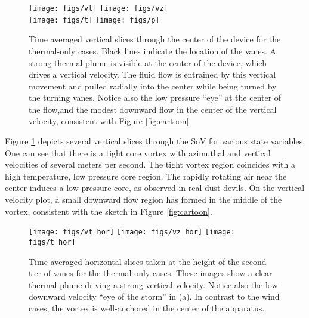 \begin{figure}[htb]

 \centering
 \texttt{[image: figs/vt]}
 \hfill
  \texttt{[image: figs/vz]}
 \\
  \centering
  \texttt{[image: figs/t]}
 \hfill
 \texttt{[image: figs/p]}
 \caption{Time averaged vertical slices through the center of the device
 for the thermal-only cases. Black lines indicate the location of the
 vanes. A strong thermal plume is visible at the center of the device,
 which drives a vertical velocity. The fluid flow is entrained by this
 vertical movement and pulled radially into the center while being
 turned by the turning vanes. Notice also the low pressure ``eye'' at
 the center of the flow,and the modest downward flow in the
 center of the vertical velocity, consistent with Figure
 \ref{fig:cartoon}.}
 \label{fig:to-vert}
\end{figure}

%
%
%
Figure \ref{fig:to-vert} depicts several vertical slices through the SoV
for various state variables. One can see that there is a tight core
vortex with azimuthal and vertical velocities of several meters per
second. The tight vortex region coincides with a high temperature, low
pressure core region. The rapidly rotating air near the center induces
a low pressure core, as observed in real dust devils.
On the vertical velocity plot, a small downward flow region has formed in
the middle of the vortex, consistent with the sketch in Figure
\ref{fig:cartoon}.  

\begin{figure}[htb]

 \centering
  \texttt{[image: figs/vt\_hor]}
 \hfill
  \texttt{[image: figs/vz\_hor]}
 \hfill
  \texttt{[image: figs/t\_hor]}
 \caption{Time averaged horizontal slices taken at the height of the
 second tier of vanes for the thermal-only cases. These images show a
 clear thermal plume driving a strong vertical velocity. Notice also the
 low downward velocity ``eye of the storm'' in (a). In contrast to the
 wind cases, the vortex is well-anchored in the center of the apparatus. }
 \label{fig:to-hor}
\end{figure}

